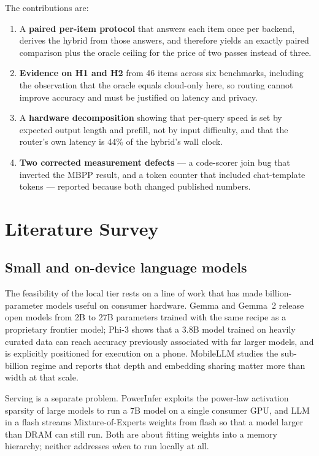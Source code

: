 \documentclass[11pt,a4paper]{article}
\begin{document}
The contributions are:
\begin{enumerate}
\item A \textbf{paired per-item protocol} that answers each item once per
backend, derives the hybrid from those answers, and therefore yields an exactly
paired comparison plus the oracle ceiling for the price of two passes instead
of three.
\item \textbf{Evidence on H1 and H2} from 46 items across six
benchmarks, including the observation that the oracle equals cloud-only here, so
routing cannot improve accuracy and must be justified on latency and privacy.
\item A \textbf{hardware decomposition} showing that per-query speed is set by
expected output length and prefill, not by input difficulty, and that the
router's own latency is 44\% of the hybrid's wall clock.
\item \textbf{Two corrected measurement defects} --- a code-scorer join bug that
inverted the MBPP result, and a token counter that included chat-template
tokens --- reported because both changed published numbers.
\end{enumerate}

\section{Literature Survey}

\subsection{Small and on-device language models}
The feasibility of the local tier rests on a line of work that has made
billion-parameter models useful on consumer hardware. Gemma \cite{gemma} and
Gemma~2 \cite{gemma2} release open models from 2B to 27B parameters trained with
the same recipe as a proprietary frontier model; Phi-3 \cite{phi3} shows that a
3.8B model trained on heavily curated data can reach accuracy previously
associated with far larger models, and is explicitly positioned for execution
on a phone. MobileLLM \cite{mobilellm} studies the sub-billion regime and reports
that depth and embedding sharing matter more than width at that scale.

Serving is a separate problem. PowerInfer \cite{powerinfer} exploits the
power-law activation sparsity of large models to run a 7B model on a single
consumer GPU, and LLM in a flash \cite{llmflash} streams Mixture-of-Experts
weights from flash so that a model larger than DRAM can still run. Both are
about fitting weights into a memory hierarchy; neither addresses \emph{when} to
run locally at all.
\end{document}
